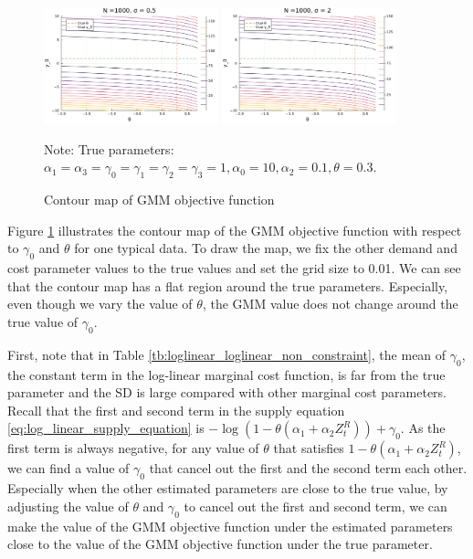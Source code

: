 \documentclass[11pt, a4paper]{article}
\begin{document}
\begin{figure}[!htbp]
  \begin{center}
  \includegraphics[width = 0.45\textwidth]
  {figuretable/contour_loglinear_loglinear_n_1000_sigma_0.5.pdf}
  \includegraphics[width = 0.45\textwidth]
  {figuretable/contour_loglinear_loglinear_n_1000_sigma_2.pdf}
  \caption{Contour map of GMM objective function}
  \label{fg:contour_loglinear_loglinear_n_1000_sigma_2} 
  \end{center}
  \footnotesize
  Note: True parameters: $\alpha_1 = \alpha_3 = \gamma_0 = \gamma_1 = \gamma_2  = \gamma_3 = 1, \alpha_0 = 10, \alpha_2 = 0.1,  \theta = 0.3.$
\end{figure} 

Figure \ref{fg:contour_loglinear_loglinear_n_1000_sigma_2} illustrates the contour map of the GMM objective function with respect to $\gamma_0$ and $\theta$ for one typical data.
To draw the map, we fix the other demand and cost parameter values to the true values and set the grid size to 0.01.
We can see that the contour map has a flat region around the true parameters.
Especially, even though we vary the value of $\theta$, the GMM value does not change around the true value of $\gamma_0$.

First, note that in Table \ref{tb:loglinear_loglinear_non_constraint}, the mean of $\gamma_0$, the constant term in the log-linear marginal cost function, is far from the true parameter and the SD is large compared with other marginal cost parameters. 
Recall that the first and second term in the supply equation \eqref{eq:log_linear_supply_equation} is $-\log(1 - \theta(\alpha_1 + \alpha_2 Z^{R}_{t})) + \gamma_0$.
As the first term is always negative, for any value of $\theta$ that satisfies $1 - \theta(\alpha_1 + \alpha_2 Z^{R}_{t})$, we can find a value of $\gamma_0$ that cancel out the first and the second term each other.
Especially when the other estimated parameters are close to the true value, by adjusting the value of $\theta$ and $\gamma_0$ to cancel out the first and second term, we can make the value of the GMM objective function under the estimated parameters close to the value of the GMM objective function under the true parameter.
\end{document}
